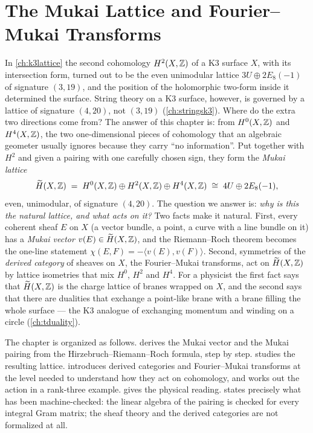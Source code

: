 \chapter{The Mukai Lattice and Fourier--Mukai Transforms}\label{ch:mukai}

In \cref{ch:k3lattice} the second cohomology $H^2(X,\mathbb{Z})$ of a K3 surface $X$, with its
intersection form, turned out to be the even unimodular lattice $3U\oplus 2E_8(-1)$ of signature
$(3,19)$, and the position of the holomorphic two-form inside it determined the surface. String
theory on a K3 surface, however, is governed by a lattice of signature $(4,20)$, not $(3,19)$
(\cref{ch:stringsk3}). Where do the extra two directions come from? The answer of this chapter is:
from $H^0(X,\mathbb{Z})$ and $H^4(X,\mathbb{Z})$, the two one-dimensional pieces of cohomology that an
algebraic geometer usually ignores because they carry ``no information''. Put together with
$H^2$ and given a pairing with one carefully chosen sign, they form the \emph{Mukai lattice}
\[
  \widetilde H(X,\mathbb{Z})\;=\;H^0(X,\mathbb{Z})\oplus H^2(X,\mathbb{Z})\oplus H^4(X,\mathbb{Z})\;\cong\;4U\oplus 2E_8(-1),
\]
even, unimodular, of signature $(4,20)$. The question we answer is: \emph{why is this the natural
lattice, and what acts on it?} Two facts make it natural. First, every coherent sheaf $E$ on $X$
(a vector bundle, a point, a curve with a line bundle on it) has a \emph{Mukai vector}
$v(E)\in\widetilde H(X,\mathbb{Z})$, and the Riemann--Roch theorem becomes the one-line statement
$\chi(E,F)=-\langle v(E),v(F)\rangle$. Second, symmetries of the \emph{derived category} of
sheaves on $X$, the Fourier--Mukai transforms, act on $\widetilde H(X,\mathbb{Z})$ by lattice isometries
that mix $H^0$, $H^2$ and $H^4$. For a physicist the first fact says that $\widetilde H(X,\mathbb{Z})$ is
the charge lattice of branes wrapped on $X$, and the second says that there are dualities that
exchange a point-like brane with a brane filling the whole surface --- the K3 analogue of
exchanging momentum and winding on a circle (\cref{ch:tduality}).

The chapter is organized as follows.  derives the Mukai vector and the Mukai
pairing from the Hirzebruch--Riemann--Roch formula, step by step. 
studies the resulting lattice.  introduces derived categories and
Fourier--Mukai transforms at the level needed to understand how they act on cohomology, and
works out the action in a rank-three example.  gives the physical
reading.  states precisely what has been machine-checked: the linear
algebra of the pairing is checked for every integral Gram matrix; the sheaf theory and the
derived categories are not formalized at all.

